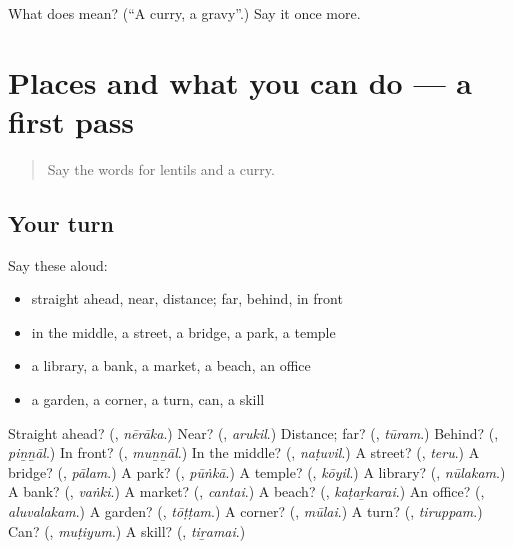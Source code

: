 \begin{tcolorbox}[breakable,colback=teal!4,colframe=teal!35!black,title={Before you move on}]
What does  mean? (\textquotedblleft{}A curry, a gravy\textquotedblright{}.) Say it once more.
\end{tcolorbox}
\section[(dialogue)]{Places and what you can do — a first pass}

\label{lesson:TA-R121-first-pass-places-and-what-you-can-do}



\begin{quote}
Say the words for lentils and a curry.
\end{quote}

\subsection*{Your turn}
Say these aloud:

\begin{itemize}
\raggedright
  \item straight ahead, near, distance; far, behind, in front
  \item in the middle, a street, a bridge, a park, a temple
  \item a library, a bank, a market, a beach, an office
  \item a garden, a corner, a turn, can, a skill
\end{itemize}

\begin{tcolorbox}[breakable,colback=teal!4,colframe=teal!35!black,title={Before you move on}]
Straight ahead? (\textbf{}, \emph{nērāka}.) Near? (\textbf{}, \emph{arukil}.) Distance; far? (\textbf{}, \emph{tūram}.) Behind? (\textbf{}, \emph{piṉṉāl}.) In front? (\textbf{}, \emph{muṉṉāl}.) In the middle? (\textbf{}, \emph{naṭuvil}.) A street? (\textbf{}, \emph{teru}.) A bridge? (\textbf{}, \emph{pālam}.) A park? (\textbf{}, \emph{pūṅkā}.) A temple? (\textbf{}, \emph{kōyil}.) A library? (\textbf{}, \emph{nūlakam}.) A bank? (\textbf{}, \emph{vaṅki}.) A market? (\textbf{}, \emph{cantai}.) A beach? (\textbf{}, \emph{kaṭaṟkarai}.) An office? (\textbf{}, \emph{aluvalakam}.) A garden? (\textbf{}, \emph{tōṭṭam}.) A corner? (\textbf{}, \emph{mūlai}.) A turn? (\textbf{}, \emph{tiruppam}.) Can? (\textbf{}, \emph{muṭiyum}.) A skill? (\textbf{}, \emph{tiṟamai}.)
\end{tcolorbox}
